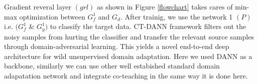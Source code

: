 Gradient reveral layer $(grl)$ \cite{uda} as shown in Figure \ref{flowchart} takes cares of min-max optimization between $G_{f}^1$ and $G_d$. After trainig, we use the network 1 $(P)$ i.e. $(G_{f}^1$ \& $G_{y}^1)$ to classify the target data. CT-DANN framework filters out the noisy samples from
hurting the classifier and transfer the relevant source samples through domain-adversarial learning. This yields a novel end-to-end deep architecture for wild unsupervised domain adaptation. Here we used DANN as a backbone, similarly we can use other well estabished standard domain adapatation network and integrate co-teaching in the same way it is done here.